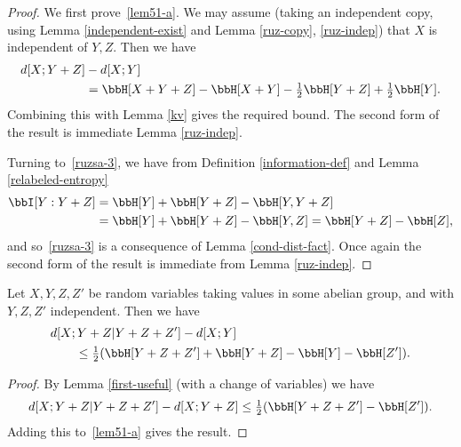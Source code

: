   \begin{proof}
    \leanok
  We first prove~\eqref{lem51-a}. We may assume (taking an independent copy, using Lemma \ref{independent-exist} and Lemma \ref{ruz-copy}, \ref{ruz-indep}) that $X$ is independent of $Y, Z$. Then we have
  \begin{align*}  d[X;Y+Z] & - d[X;Y] \\ & = \bbH[X + Y + Z] - \bbH[X+Y] - \tfrac{1}{2}\bbH[Y + Z] + \tfrac{1}{2} \bbH[Y].\end{align*}
  Combining this with Lemma \ref{kv} gives the required bound. The second form of the result is immediate Lemma \ref{ruz-indep}.

  Turning to~\eqref{ruzsa-3}, we have from Definition \ref{information-def} and Lemma \ref{relabeled-entropy}
  \begin{align*}  \bbI[Y : Y+Z] & = \bbH[Y] + \bbH[Y + Z] - \bbH[Y, Y + Z] \\ & = \bbH[Y] + \bbH[Y + Z] - \bbH[Y, Z]  = \bbH[Y + Z] - \bbH[Z],\end{align*}
  and so~\eqref{ruzsa-3} is a consequence of Lemma \ref{cond-dist-fact}. Once again the second form of the result is immediate from Lemma \ref{ruz-indep}.
\end{proof}

\begin{lemma}\label{second-useful}
  \leanok
  Let $X, Y, Z, Z'$ be random variables taking values in some abelian group, and with $Y, Z, Z'$ independent. Then we have
  \begin{align}\nonumber
  & d[X;Y + Z | Y + Z + Z'] - d[X;Y] \\ & \qquad \leq \tfrac{1}{2} ( \bbH[Y + Z + Z'] + \bbH[Y + Z] - \bbH[Y] - \bbH[Z']).\label{7111}
  \end{align}
  \end{lemma}

  \begin{proof}
    \leanok
  By Lemma \ref{first-useful} (with a change of variables) we have
  \[ d[X; Y + Z | Y + Z + Z'] - d[X; Y + Z] \leq \tfrac{1}{2}( \bbH[Y + Z + Z'] - \bbH[Z']).\]
  Adding this to~\eqref{lem51-a} gives the result.
  \end{proof}
